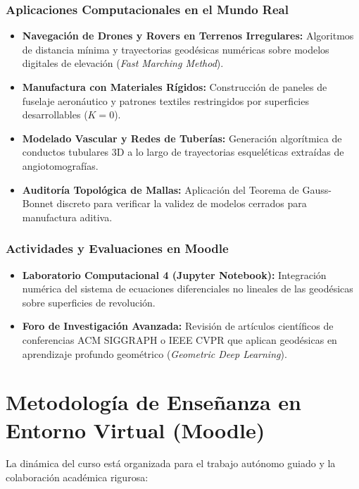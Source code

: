 \documentclass[11pt, a4paper]{article}
\begin{document}
	\subsubsection*{Aplicaciones Computacionales en el Mundo Real}
	\begin{itemize}
		\item \textbf{Navegación de Drones y Rovers en Terrenos Irregulares:} Algoritmos de distancia mínima y trayectorias geodésicas numéricas sobre modelos digitales de elevación (\emph{Fast Marching Method}).
		\item \textbf{Manufactura con Materiales Rígidos:} Construcción de paneles de fuselaje aeronáutico y patrones textiles restringidos por superficies desarrollables ($K = 0$).
		\item \textbf{Modelado Vascular y Redes de Tuberías:} Generación algorítmica de conductos tubulares 3D a lo largo de trayectorias esqueléticas extraídas de angiotomografías.
		\item \textbf{Auditoría Topológica de Mallas:} Aplicación del Teorema de Gauss-Bonnet discreto para verificar la validez de modelos cerrados para manufactura aditiva.
	\end{itemize}
	
	\subsubsection*{Actividades y Evaluaciones en Moodle}
	\begin{itemize}
		\item \textbf{Laboratorio Computacional 4 (Jupyter Notebook):} Integración numérica del sistema de ecuaciones diferenciales no lineales de las geodésicas sobre superficies de revolución.
		\item \textbf{Foro de Investigación Avanzada:} Revisión de artículos científicos de conferencias ACM SIGGRAPH o IEEE CVPR que aplican geodésicas en aprendizaje profundo geométrico (\emph{Geometric Deep Learning}).
	\end{itemize}
	
	\section{Metodología de Enseñanza en Entorno Virtual (Moodle)}
	
	La dinámica del curso está organizada para el trabajo autónomo guiado y la colaboración académica rigurosa:
	
\end{document}
